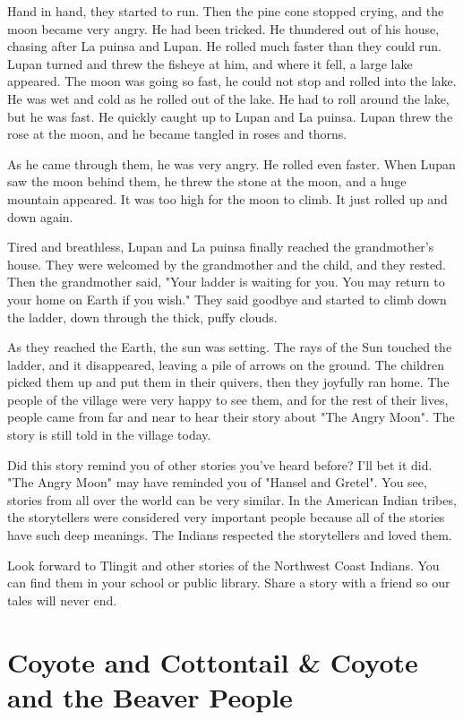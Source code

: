 Hand in hand, they started to run. Then the pine cone stopped crying, and the moon became very angry. He had been tricked. He thundered out of his house, chasing after La puinsa and Lupan. He rolled much faster than they could run. Lupan turned and threw the fisheye at him, and where it fell, a large lake appeared. The moon was going so fast, he could not stop and rolled into the lake. He was wet and cold as he rolled out of the lake. He had to roll around the lake, but he was fast. He quickly caught up to Lupan and La puinsa. Lupan threw the rose at the moon, and he became tangled in roses and thorns.

As he came through them, he was very angry. He rolled even faster. When Lupan saw the moon behind them, he threw the stone at the moon, and a huge mountain appeared. It was too high for the moon to climb. It just rolled up and down again.

Tired and breathless, Lupan and La puinsa finally reached the grandmother's house. They were welcomed by the grandmother and the child, and they rested. Then the grandmother said, "Your ladder is waiting for you. You may return to your home on Earth if you wish." They said goodbye and started to climb down the ladder, down through the thick, puffy clouds.

As they reached the Earth, the sun was setting. The rays of the Sun touched the ladder, and it disappeared, leaving a pile of arrows on the ground. The children picked them up and put them in their quivers, then they joyfully ran home. The people of the village were very happy to see them, and for the rest of their lives, people came from far and near to hear their story about "The Angry Moon". The story is still told in the village today.

Did this story remind you of other stories you've heard before? I'll bet it did. "The Angry Moon" may have reminded you of "Hansel and Gretel". You see, stories from all over the world can be very similar. In the American Indian tribes, the storytellers were considered very important people because all of the stories have such deep meanings. The Indians respected the storytellers and loved them.

Look forward to Tlingit and other stories of the Northwest Coast Indians. You can find them in your school or public library. Share a story with a friend so our tales will never end.

\section{Coyote and Cottontail \& Coyote and the Beaver People}

